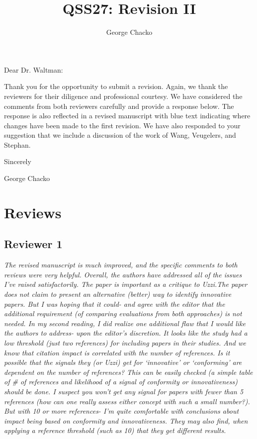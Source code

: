 \documentclass[11pt, oneside]{article}   	%
\title{QSS27: Revision II}
\author{George Chacko}
\begin{document}
\maketitle

Dear Dr. Waltman:

\vspace{5mm}
\raggedright 
Thank you for the opportunity to submit a revision. Again, we thank the reviewers for their diligence and professional courtesy. We have considered the comments from both reviewers carefully and provide a response below. The response is also reflected in a revised manuscript with blue text indicating where changes have been made to the first revision. We have also responded to your suggestion that we include a discussion of the work of Wang, Veugelers, and Stephan. 

\vspace{3mm}
Sincerely
\vspace{5mm}

George Chacko

\section{Reviews}
\subsection{Reviewer 1}

\emph{The revised manuscript is much improved, and the specific comments to both reviews were very helpful. Overall, the authors have addressed all of the issues I’ve raised satisfactorily. The paper is important as a critique to Uzzi.The paper does not claim to present an alternative (better) way to identify innovative papers.  But I was hoping that it could- and agree with the editor that the additional requirement (of comparing evaluations from both approaches) is not needed.
In my second reading, I did realize one additional flaw that I would like the authors to address- upon the editor’s discretion.  It looks like the study had a low threshold (just two references) for including papers in their studies. And we know that citation impact is correlated with the number of references. Is it possible that the signals they (or Uzzi) get for ‘innovative’ or ‘conforming’ are dependent on the number of references? This can be easily checked (a simple table of \# of references and likelihood of a signal of conformity or innovativeness) should be done. I suspect you won’t get any signal for papers with fewer than 5 references (how can one really assess either concept with such a small number?).  But with 10 or more references- I'm quite comfortable with conclusions about impact being based on conformity and innovativeness. They may also find, when applying a reference threshold (such as 10) that they get different results.}
\end{document}
